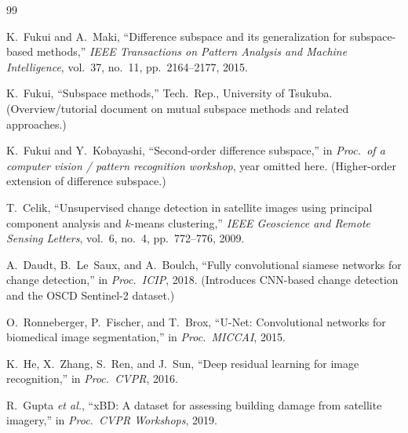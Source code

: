 \documentclass[twoside,11pt]{article}
\begin{document}
\begin{thebibliography}{99}

K.~Fukui and A.~Maki, ``Difference subspace and its generalization for
subspace-based methods,'' \emph{IEEE Transactions on Pattern Analysis and
Machine Intelligence}, vol.~37, no.~11, pp.~2164--2177, 2015.

K.~Fukui, ``Subspace methods,'' Tech.\ Rep., University of Tsukuba.
(Overview/tutorial document on mutual subspace methods and related
approaches.)

K.~Fukui and Y.~Kobayashi, ``Second-order difference subspace,'' in
\emph{Proc.\ of a computer vision / pattern recognition workshop},
year omitted here. (Higher-order extension of difference subspace.)

T.~Celik, ``Unsupervised change detection in satellite images using principal
component analysis and $k$-means clustering,'' \emph{IEEE Geoscience and
Remote Sensing Letters}, vol.~6, no.~4, pp.~772--776, 2009.

A.~Daudt, B.~Le~Saux, and A.~Boulch, ``Fully convolutional siamese networks
for change detection,'' in \emph{Proc.\ ICIP}, 2018. (Introduces CNN-based
change detection and the OSCD Sentinel-2 dataset.)

O.~Ronneberger, P.~Fischer, and T.~Brox, ``U-Net: Convolutional networks for
biomedical image segmentation,'' in \emph{Proc.\ MICCAI}, 2015.

K.~He, X.~Zhang, S.~Ren, and J.~Sun, ``Deep residual learning for image
recognition,'' in \emph{Proc.\ CVPR}, 2016.

R.~Gupta \emph{et al.}, ``xBD: A dataset for assessing building damage from
satellite imagery,'' in \emph{Proc.\ CVPR Workshops}, 2019.

\end{thebibliography}
\end{document}
